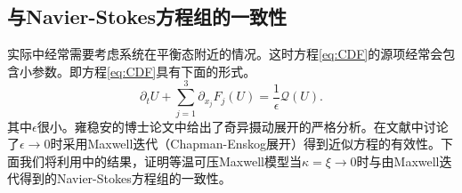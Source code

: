 	\subsection{与Navier-Stokes方程组的一致性}%
	实际中经常需要考虑系统在平衡态附近的情况。这时方程\eqref{eq:CDF}的源项经常会包含小参数。即方程\eqref{eq:CDF}具有下面的形式。
	\begin{equation}\label{eq:CDFSingular}
		\partial_t U + \sum_{j=1}^3 \partial_{x_j} F_j(U) = \frac{1}{\epsilon}\mathcal{Q} (U) .
	\end{equation}
	其中$\epsilon$很小。雍稳安的博士论文\cite{yong1999singular}中给出了奇异摄动展开的严格分析。在文献\cite{yang2015validity}中讨论了$\epsilon \rightarrow 0$时采用Maxwell迭代（Chapman-Enskog展开）得到近似方程的有效性。下面我们将利用\cite{yang2015validity}中的结果，证明等温可压Maxwell模型当$\kappa=\xi \rightarrow 0$时与由Maxwell迭代得到的Navier-Stokes方程组的一致性。

